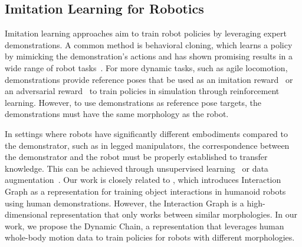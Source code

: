 \subsection{Imitation Learning for Robotics}

Imitation learning approaches aim to train robot policies by leveraging expert demonstrations. A common method is behavioral cloning, which learns a policy by mimicking the demonstration's actions and has shown promising results in a wide range of robot tasks~\citep{MobileAloha, chi2023diffusion, jang2022bc, li2019using, shafiullah2022behavior}. For more dynamic tasks, such as agile locomotion, demonstrations provide reference poses that be used as an imitation reward~\citep{RoboImitationPeng20, whirl} or an adversarial reward~\citep{Escontrela22arXiv_AMP_in_real} to train policies in simulation through reinforcement learning. However, to use demonstrations as reference pose targets, the demonstrations must have the same morphology as the robot. 

In settings where robots have significantly different embodiments compared to the demonstrator, such as in 
legged manipulators, the correspondence between the demonstrator and the robot must be properly established to transfer knowledge. This can be achieved through unsupervised learning~\citep{li2023crossloco, li2023ace} or data augmentation~\citep{hirose2023exaug}. Our work is closely related to \citep{InteractionGraph}, which introduces Interaction Graph as a representation for training object interactions in humanoid robots using human demonstrations.
However, the Interaction Graph is a high-dimensional representation that only works between similar morphologies. In our work, we propose the Dynamic Chain, a representation that leverages human whole-body motion data to train policies for robots with different morphologies.






